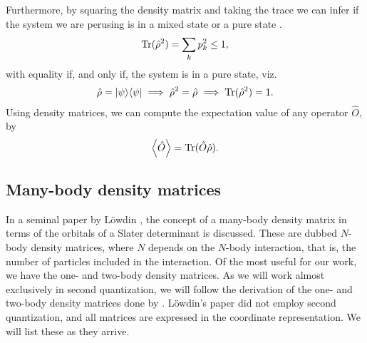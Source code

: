         Furthermore, by squaring the density matrix and taking the trace we can
        infer if the system we are perusing is in a mixed state or a pure state
        \cite{modern-qm}.
        \begin{align}
            \operatorname{Tr}(\hat{\rho}^2) = \sum_{k} p_k^2 \leq 1,
        \end{align}
        with equality if, and only if, the system is in a pure state, viz.
        \begin{align}
            \hat{\rho} = | \psi \rangle\langle \psi |
            \implies \hat{\rho}^2 = \hat{\rho}
            \implies \operatorname{Tr}(\hat{\rho}^2) = 1.
        \end{align}
        Using density matrices, we can compute the expectation value of any
        operator $\hat{O}$, by \cite{modern-qm}
        \begin{align}
            \left\langle \hat{O} \right\rangle = \operatorname{Tr}(\hat{O}\hat{\rho}).
        \end{align}

        \subsection{Many-body density matrices}
            In a seminal paper by Löwdin \cite{lowdin-density-matrices}, the
            concept of a many-body density matrix in terms of the orbitals of a
            Slater determinant is discussed. These are dubbed $N$-body density
            matrices, where $N$ depends on the $N$-body interaction, that is,
            the number of particles included in the interaction. Of the most
            useful for our work, we have the one- and two-body density matrices.
            As we will work almost exclusively in second quantization, we will
            follow the derivation of the one- and two-body density matrices done
            by \citeauthor{helgaker-molecular}. Löwdin's paper
            \cite{lowdin-density-matrices} did not employ second quantization,
            and all matrices are expressed in the coordinate representation. We
            will list these as they arrive.
